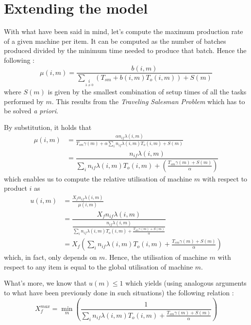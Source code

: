 \section{Extending the model}

With what have been said in mind, let's compute the maximum production rate of a given machine per item. It can be computed as the number of batches produced divided by the minimum time needed to produce that batch. Hence the following : 
\[ \mu(i,m) = \dfrac{b(i,m)}{\sum_{\underset{\lambda\ne 0}{i}} (T_{sm} + b(i,m)T_o(i,m)) + S(m) } \]
where $S(m)$ is given by the smallest combination of setup times of all the tasks performed by $m$. This results from the \textit{Traveling Salesman Problem} which has to be solved \textit{a priori}. 

By substitution, it holds that 
\[
    \begin{split}
        \mu(i,m) &= \frac{\alpha n_{if}\lambda(i,m)}{ T_{sm}\gamma(m) + \alpha\sum_i n_{if}\lambda(i,m)T_o(i,m) + S(m) }\\
        &= \dfrac{ n_{if}\lambda(i,m) }{ \sum_i n_{if}\lambda(i,m)T_o(i,m) + \left( \frac{ T_{sm}\gamma(m) + S(m) }{ \alpha } \right) }
    \end{split}
\]
which enables us to compute the relative utilisation of machine $m$ with respect to product $i$ as 
\[
    \begin{split}
        u(i,m) &= \frac{X_fn_{if}\lambda(i,m)}{\mu(i,m)}\\
        &= \dfrac{ X_fn_{if}\lambda(i,m) }{ \frac{ n_{if}\lambda(i,m) }{ \sum_i n_{if}\lambda(i,m)T_o(i,m) + \frac{T_{sm}\gamma(m) + S(m)}{\alpha} } }\\
        &= X_f\left( \sum_i n_{if}\lambda(i,m)T_o(i,m) + \frac{T_{sm}\gamma(m) + S(m)}{\alpha} \right)
    \end{split}
\]
which, in fact, only depends on $m$. Hence, the utilisation of machine $m$ with respect to any item is equal to the global utilisation of machine $m$. 

What's more, we know that $u(m)\le 1$ which yields (using analogous arguments to what have been previously done in such situations) the following relation : 
\[
    X_f^{max} = \min_m\left( \frac{1}{ \sum_i n_{if}\lambda(i,m)T_o(i,m) + \frac{T_{sm}\gamma(m) + S(m)}{\alpha} } \right)
\]

